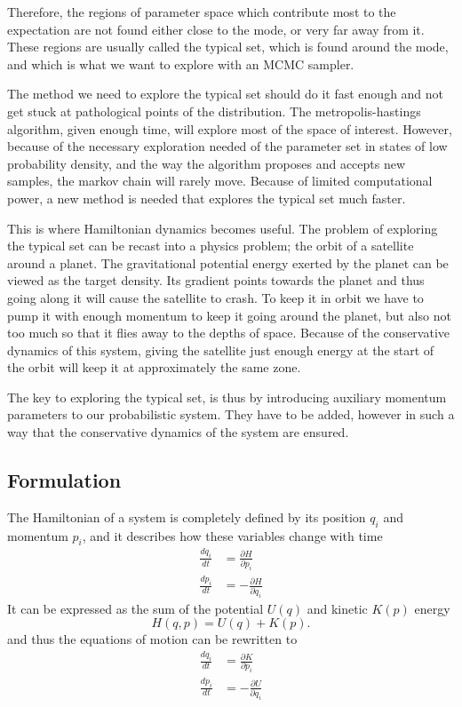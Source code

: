 Therefore, the regions of parameter space which contribute most to the expectation are not found either close to the mode, or very far away from it. These regions are usually called the typical set, which is found around the mode, and which is what we want to explore with an MCMC sampler. 


The method we need to explore the typical set should do it fast enough and not get stuck at pathological points of the distribution. The metropolis-hastings algorithm, given enough time, will explore most of the space of interest. However, because of the necessary exploration needed of the parameter set in states of low probability density, and the way the algorithm proposes and accepts new samples, the markov chain will rarely move. Because of limited computational power, a new method is needed that explores the typical set much faster.

This is where Hamiltonian dynamics becomes useful. The problem of exploring the typical set can be recast into a physics problem; the orbit of a satellite around a planet. The gravitational potential energy exerted by the planet can be viewed as the target density. Its gradient points towards the planet and thus going along it will cause the satellite to crash. To keep it in orbit we have to pump it with enough momentum to keep it going around the planet, but also not too much so that it flies away to the depths of space. Because of the conservative dynamics of this system, giving the satellite just enough energy at the start of the orbit will keep it at approximately the same zone.

The key to exploring the typical set, is thus by introducing auxiliary momentum parameters to our probabilistic system. They have to be added, however in such a way that the conservative dynamics of the system are ensured.

\subsection{Formulation}

The Hamiltonian of a system is completely defined by its position $q_i$ and momentum $p_i$, and it describes how these variables change with time 
\begin{align}
	\frac{dq_i}{dt} &= \frac{\partial H}{\partial p_i}\nonumber\\
		\frac{dp_i}{dt} &= -\frac{\partial H}{\partial q_i} \label{eq:motion}
\end{align}
It can be expressed as the sum of the potential $U(q)$ and kinetic $K(p)$ energy
\begin{equation}
	H(q,p) = U(q) + K(p).
\end{equation}
and thus the equations of motion can be rewritten to 
\begin{align}
\frac{dq_i}{dt} &= \frac{\partial K}{\partial p_i}\nonumber\\
\frac{dp_i}{dt} &= -\frac{\partial U}{\partial q_i} \label{eq:motion_kinetic_potential}
\end{align}

